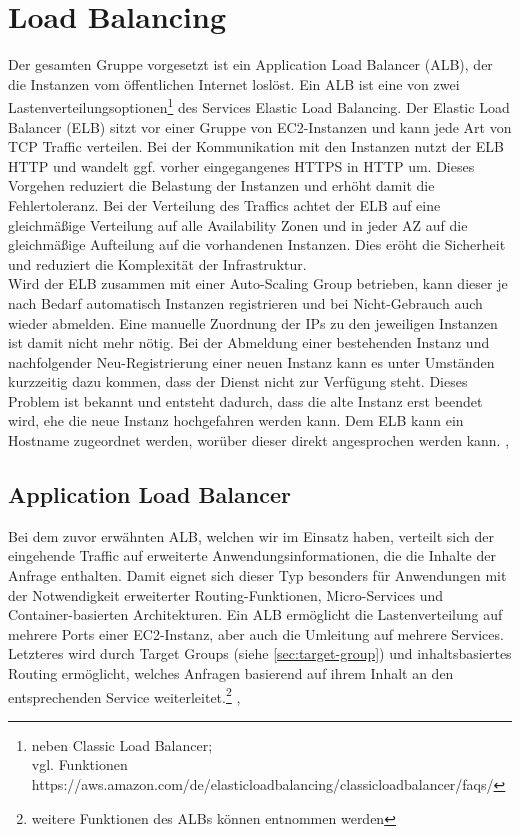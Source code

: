 \section{Load Balancing}
\label{sec:elb}
Der gesamten Gruppe vorgesetzt ist ein Application Load Balancer (ALB), der die Instanzen vom öffentlichen Internet loslöst. Ein ALB ist eine von zwei Lastenverteilungsoptionen\footnote{neben Classic Load Balancer; \\vgl. Funktionen https://aws.amazon.com/de/elasticloadbalancing/classicloadbalancer/faqs/} des Services Elastic Load Balancing.
Der Elastic Load Balancer (ELB) sitzt vor einer Gruppe von EC2-Instanzen und kann jede Art von TCP Traffic verteilen. Bei der Kommunikation mit den Instanzen nutzt der ELB HTTP und wandelt ggf. vorher eingegangenes HTTPS in HTTP um. Dieses Vorgehen reduziert die Belastung der Instanzen und erhöht damit die Fehlertoleranz. Bei der Verteilung des Traffics achtet der ELB auf eine gleichmäßige Verteilung auf alle Availability Zonen und in jeder AZ auf die gleichmäßige Aufteilung auf die vorhandenen Instanzen. Dies eröht die Sicherheit und reduziert die Komplexität der Infrastruktur. \\
Wird der ELB zusammen mit einer Auto-Scaling Group betrieben, kann dieser je nach Bedarf automatisch Instanzen registrieren und bei Nicht-Gebrauch auch wieder abmelden. Eine manuelle Zuordnung der IPs zu den jeweiligen Instanzen ist damit nicht mehr nötig. Bei der Abmeldung einer bestehenden Instanz und nachfolgender Neu-Registrierung einer neuen Instanz kann es unter Umständen kurzzeitig dazu kommen, dass der Dienst nicht zur Verfügung steht. Dieses Problem ist bekannt und entsteht dadurch, dass die alte Instanz erst beendet wird, ehe die neue Instanz hochgefahren werden kann.
Dem ELB kann ein Hostname zugeordnet werden, worüber dieser direkt angesprochen werden kann.
\cite{vliet:resilience}, \cite{aws:elb} \\

\subsection{Application Load Balancer}
\label{sec:alb}
Bei dem zuvor erwähnten ALB, welchen wir im Einsatz haben, verteilt sich der eingehende Traffic auf erweiterte Anwendungsinformationen, die die Inhalte der Anfrage enthalten. Damit eignet sich dieser Typ besonders für Anwendungen mit der Notwendigkeit erweiterter Routing-Funktionen, Micro-Services und Container-basierten Architekturen. Ein ALB ermöglicht die Lastenverteilung auf mehrere Ports einer EC2-Instanz, aber auch die Umleitung auf mehrere Services. Letzteres wird durch Target Groups (siehe \ref{sec:target-group}) und inhaltsbasiertes Routing ermöglicht, welches Anfragen basierend auf ihrem Inhalt an den entsprechenden Service weiterleitet.\footnote{weitere Funktionen des ALBs können \cite{aws:alb} entnommen werden} \cite{aws:elb}, \cite{aws:alb}

